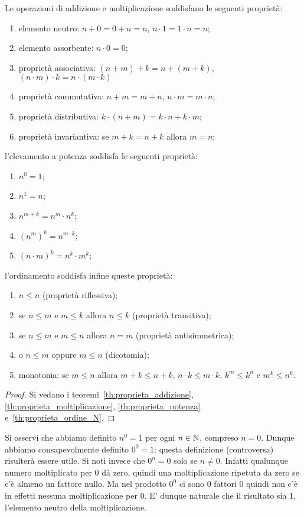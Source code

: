 \begin{theorem}[operazioni su $\NN$]
Le operazioni di addizione e moltiplicazione 
soddisfano le seguenti proprietà:
  \begin{enumerate}
    \item elemento neutro:
      $n + 0 = 0 + n = n$,
      $n\cdot 1 = 1\cdot n = n$;
    \item elemento assorbente:
      $n\cdot 0 = 0$;
    \item proprietà associativa: 
      $(n+m)+k = n+(m+k)$, $(n\cdot m)\cdot k = n \cdot (m\cdot k)$
    \item proprietà commutativa: 
      $n+m = m+n$, $n\cdot m = m\cdot n$;
    \item proprietà distributiva:
     $k\cdot (n+m) = k\cdot n + k\cdot m$;
    \item proprietà invariantiva:
     se $m+k = n+k$ allora $m=n$;
  \end{enumerate}
l'elevamento a potenza soddisfa le seguenti proprietà:
\begin{enumerate}
  \item $n^0 = 1$;
  \item $n^1 = n$;
  \item $n^{m+k} = n^m \cdot n^k$;
  \item $(n^m)^k = n^{m\cdot k}$;
  \item $(n\cdot m)^k = n^k \cdot m^k$;
\end{enumerate}
l'ordinamento soddisfa infine queste proprietà:
\begin{enumerate}
  \item $n\le n$ (proprietà riflessiva);
  \item se $n\le m$ e $m\le k$ allora $n\le k$ (proprietà transitiva);
  \item se $n\le m$ e $m\le n$ allora $n=m$ (proprietà antisimmetrica);
  \item o $n\le m$ oppure $m\le n$ (dicotomia);
  \item monotonia:
   se $m\le n$ allora 
   $m+k\le n+k$, $n\cdot k \le m\cdot k$,
   $k^m \le k^n$ e $m^k \le n^k$. 
\end{enumerate}
\end{theorem}
\begin{proof}
  Si vedano i teoremi~\ref{th:proprieta_addizione},
  \ref{th:proprieta_moltiplicazione},
  \ref{th:proprieta_potenza} e~\ref{th:proprieta_ordine_N}.
\end{proof}

Si osservi che abbiamo definito $n^0=1$ per ogni $n\in {\mathbb N}$,
compreso $n=0$. 
Dunque abbiamo consapevolmente definito $0^0=1$:
questa definizione (controversa) risulterà essere utile.
Si noti invece che $0^n=0$ solo se $n\neq 0$.
Infatti qualunque numero moltiplicato per $0$ dà zero, 
quindi una moltiplicazione ripetuta da zero 
se c'è almeno un fattore nullo. 
Ma nel prodotto $0^0$ ci sono $0$ fattori $0$ quindi non c'è in effetti nessuna 
moltiplicazione per $0$. 
E' dunque naturale che il risultato sia $1$, 
l'elemento neutro della moltiplicazione.

